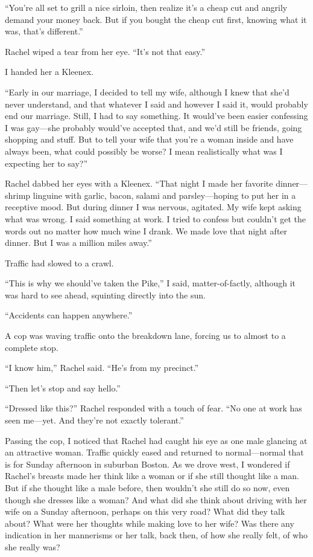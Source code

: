``You're all set to grill a nice sirloin, then realize it's a cheap cut
and angrily demand your money back. But if you bought the cheap cut
first, knowing what it was, that's different.''

Rachel wiped a tear from her eye. ``It's not that easy.''

I handed her a Kleenex.

``Early in our marriage, I decided to tell my wife, although I knew that
she'd never understand, and that whatever I said and however I said it,
would probably end our marriage. Still, I had to say something. It
would've been easier confessing I was gay---she probably would've
accepted that, and we'd still be friends, going shopping and stuff. But
to tell your wife that you're a woman inside and have always been, what
could possibly be worse? I mean realistically what was I expecting her
to say?''

Rachel dabbed her eyes with a Kleenex. ``That night I made her favorite
dinner---shrimp linguine with garlic, bacon, salami and pars\-ley---hoping
to put her in a receptive mood. But during dinner I was nervous,
agitated. My wife kept asking what was wrong. I said something at work.
I tried to confess but couldn't get the words out no matter how much
wine I drank. We made love that night after dinner. But I was a million
miles away.''

Traffic had slowed to a crawl.

``This is why we should've taken the Pike,'' I said, matter-of-factly,
although it was hard to see ahead, squinting directly into the sun.

``Accidents can happen anywhere.''

A cop was waving traffic onto the breakdown lane, forcing us to almost
to a complete stop.

``I know him,'' Rachel said. ``He's from my precinct.''

``Then let's stop and say hello.''

``Dressed like this?'' Rachel responded with a touch of fear. ``No one
at work has seen me---yet. And they're not exactly tolerant.''

Passing the cop, I noticed that Rachel had caught his eye as one male
glancing at an attractive woman. Traffic quickly eased and returned to
normal---normal that is for Sunday afternoon in suburban Boston. As we
drove west, I wondered if Rachel's breasts made her think like a woman
or if she still thought like a man. But if she thought like a male
before, then wouldn't she still do so now, even though she dresses like
a woman? And what did she think about driving with her wife on a Sunday
afternoon, perhaps on this very road? What did they talk about? What
were her thoughts while making love to her wife? Was there any
indication in her mannerisms or her talk, back then, of how she really
felt, of who she really was?

